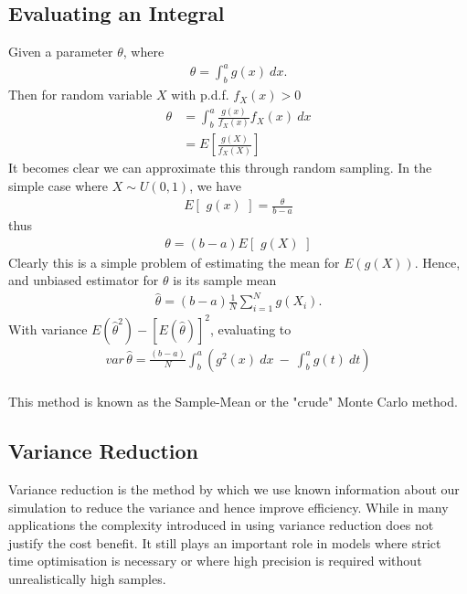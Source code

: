\documentclass{article}
\begin{document}
\subsection{Evaluating an Integral}

Given a parameter $\theta$, where
\begin{align}
\theta =\int_{b}^{a} g(x)~dx .
\end{align}
Then for random variable $X$ with p.d.f. $f_{X}(x)>0$
\begin{align}
\theta &=\int_{b}^{a}\frac{g(x)}{f_{X}(x)}f_{X}(x)~dx\\
&=E \left[ \frac{g(X)}{f_{X}(X)} \right]
\end{align}
It becomes clear we can approximate this through random sampling.
In the simple case where $X\sim U(0,1)$, we have
\begin{align}
E \left[ \,\, g(x) \,\, \right] = \frac{\theta}{b-a}
\end{align}
thus
\begin{align}
\theta=(b-a)E[\,\,g(X)\,\,]
\end{align}
Clearly this is a simple problem of estimating the mean for $E(g(X))$. 
Hence, and unbiased estimator for $\theta$ is its sample mean 
\begin{align}
\hat{\theta}=(b-a)\frac{1}{N}\sum_{i=1}^{N}g(X_{i}).
\end{align}
With variance $E(\hat{\theta}^{2})-[E(\hat{\theta})]^{2}$, evaluating to 
\begin{align}
var \, \hat{\theta} = \frac{(b-a)}{N}\int_{b}^{a} \left( g^{2}(x) ~dx~-~\int_{b}^{a}g(t) ~ dt \right)
\end{align}
\\
This method is known as the Sample-Mean or the "crude" Monte Carlo method. \cite{alma9954732790001381} 

\subsection{Variance Reduction}
Variance reduction is the method by which we use known information about our simulation to reduce the variance and hence improve efficiency.
While in many applications the complexity introduced in using variance reduction does not justify the cost benefit. It still plays an important role in models where strict time optimisation is necessary or where high precision is required without unrealistically high samples. \cite{gentle2003random}
\end{document}

